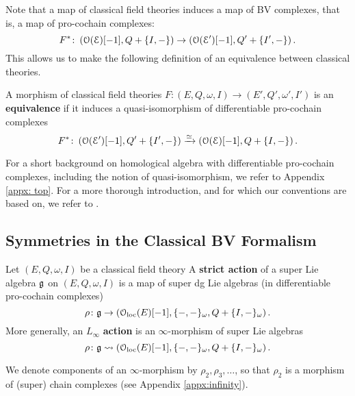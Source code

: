 \documentclass[10pt, oneside]{article}
\begin{document}
Note that a map of classical field theories induces a map of BV complexes, that is, a map of pro-cochain complexes:
\[
F^*\colon \left(\mathcal O (\mathcal E)[-1], Q + \{I,-\} \right) \to \left(\mathcal O (\mathcal E')[-1], Q' + \{I',-\} \right) .
\]
This allows us to make the following definition of an equivalence between classical theories. 

\begin{definition} \label{equivalence_def}
A morphism of classical field theories $F\colon (E, Q, \omega, I) \to (E', Q', \omega', I')$ is an {\bf equivalence} if it induces a quasi-isomorphism of differentiable pro-cochain complexes
\[
F^* \colon  \left(\mathcal O(\mathcal E')[-1], Q' + \{I',-\} \right) \xrightarrow{\simeq} \left(\mathcal O(\mathcal E)[-1], Q + \{I,-\} \right) .
\]
\end{definition}

For a short background on homological algebra with differentiable pro-cochain complexes, including the notion of quasi-isomorphism, we refer to Appendix \ref{appx: top}.
For a more thorough introduction, and for which our conventions are based on, we refer to \cite{Book1}.

\subsection{Symmetries in the Classical BV Formalism} \label{symmetry_section}


\begin{definition} \label{infinitesimal_action_def}
Let $(E, Q,\omega, I)$ be a classical field theory 
A {\bf strict action} of a super Lie algebra $\mathfrak g$ on $(E, Q,\omega, I)$ is a map of super dg Lie algebras (in differentiable pro-cochain complexes)
\[
\rho\colon \mathfrak g \to \left(\mathcal{O}_{\rm loc}(E)[-1] , \{-,-\}_\omega, Q + \{I,-\}_\omega\right) .
\]
More generally, an $L_\infty$ {\bf action} is an $\infty$-morphism of super Lie algebras
\[
\rho\colon \mathfrak g \rightsquigarrow \left(\mathcal{O}_{\rm loc}(E)[-1] , \{-,-\}_\omega, Q + \{I,-\}_\omega\right) .
\]
\end{definition}

We denote components of an $\infty$-morphism by $\rho_2, \rho_3, \dots$, so that $\rho_2$ is a morphism of (super) chain complexes (see Appendix \ref{appx:infinity}).
\end{document}
